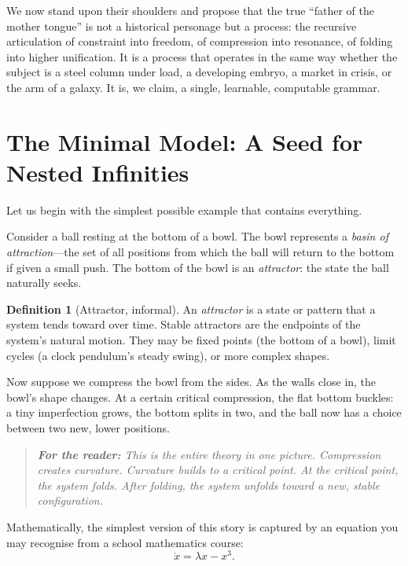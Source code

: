 \documentclass[12pt, oneside]{book}
\theoremstyle{plain}
\theoremstyle{definition}
\newtheorem{definition}{Definition}[chapter]
\theoremstyle{remark}
\newenvironment{fortheread}[1]{%
  \begin{quote}\small\itshape\textbf{For the reader:} #1\quad}
  {\end{quote}}
\begin{document}
We now stand upon their shoulders and propose that the true
``father of the mother tongue'' is not a historical personage
but a process: the recursive articulation of constraint into
freedom, of compression into resonance, of folding into higher
unification. It is a process that operates in the same way
whether the subject is a steel column under load, a developing
embryo, a market in crisis, or the arm of a galaxy. It is,
we claim, a single, learnable, computable grammar.

\section{The Minimal Model: A Seed for Nested Infinities}

Let us begin with the simplest possible example that contains
everything.

Consider a ball resting at the bottom of a bowl. The bowl
represents a \emph{basin of attraction}---the set of all positions
from which the ball will return to the bottom if given a small
push. The bottom of the bowl is an \emph{attractor}: the state
the ball naturally seeks.

\begin{definition}[Attractor, informal]
An \emph{attractor} is a state or pattern that a system tends
toward over time. Stable attractors are the endpoints of the
system's natural motion. They may be fixed points (the bottom
of a bowl), limit cycles (a clock pendulum's steady swing),
or more complex shapes.
\end{definition}

Now suppose we compress the bowl from the sides. As the walls
close in, the bowl's shape changes. At a certain critical
compression, the flat bottom buckles: a tiny imperfection grows,
the bottom splits in two, and the ball now has a choice between
two new, lower positions.

\begin{fortheread}{This is the entire theory in one picture.
Compression creates curvature. Curvature builds to a critical
point. At the critical point, the system folds. After folding,
the system unfolds toward a new, stable configuration.}
\end{fortheread}

Mathematically, the simplest version of this story is captured
by an equation you may recognise from a school mathematics course:
\begin{equation}
\dot{x} = \lambda x - x^3.
\label{eq:minmodel}
\end{equation}
\end{document}

